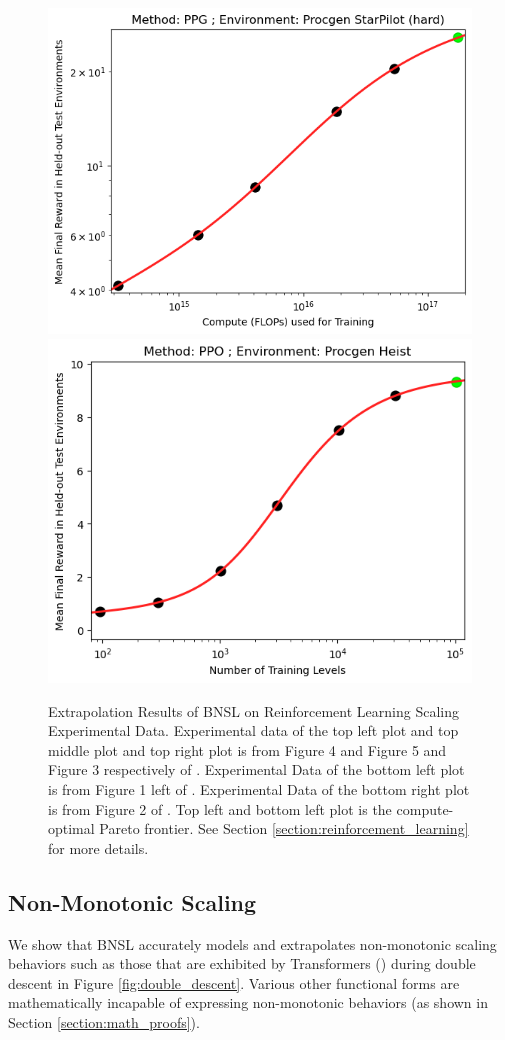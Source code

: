\documentclass{article} %
\begin{document}
\begin{figure}[hhh]
\includegraphics[width=.496\textwidth]{figures/rl/procgen/Procgen_StarPilot_width_compute.png}
\includegraphics[width=.472\textwidth]{figures/rl/procgen/Procgen_Heist.png}
\vspace{-4.0mm}
    \caption{
    Extrapolation Results of BNSL on Reinforcement Learning Scaling Experimental Data. Experimental data of the top left plot and top middle plot and top right plot is from Figure 4 and Figure 5 and Figure 3 respectively of \cite{neumann2022scaling}. Experimental Data of the bottom left plot is from Figure 1 left of \cite{hilton2023scaling}. Experimental Data of the bottom right plot is from Figure 2 of \cite{cobbe2020leveraging}. Top left and bottom left plot is the compute-optimal Pareto frontier. See Section \ref{section:reinforcement_learning} for more details.
    }
    \label{fig:rl_scaling}
\end{figure}
\FloatBarrier

\vspace{-1.9mm}

\subsection{Non-Monotonic Scaling}
\label{section:non-monotonic_scaling}
\vspace{-1.5mm}
We show that BNSL accurately models and extrapolates non-monotonic scaling behaviors such as those that are exhibited by Transformers (\cite{vaswani2017attention}) during double descent \citep{nakkiran2021deep} in Figure \ref{fig:double_descent}. Various other functional forms are mathematically incapable of expressing non-monotonic behaviors (as shown in Section \ref{section:math_proofs}).
\end{document}
